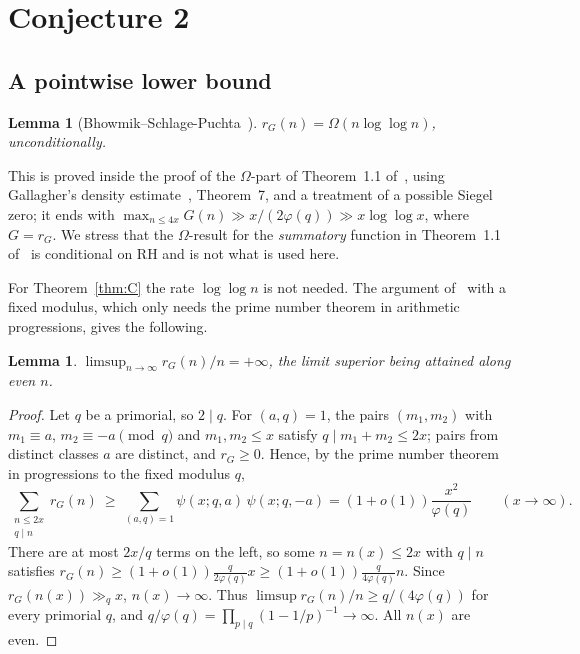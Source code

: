 \documentclass[11pt]{amsart}
\newtheorem{lemma}[theorem]{Lemma}
\theoremstyle{definition}
\theoremstyle{remark}
\numberwithin{equation}{section}
\newcommand{\rG}{r_G}
\begin{document}
\section{Conjecture 2}\label{sec:conj}

\subsection{A pointwise lower bound}
\begin{lemma}[Bhowmik--Schlage-Puchta~\cite{BSP}]\label{lem:BSP}
$\rG(n)=\Omega(n\log\log n)$, unconditionally.
\end{lemma}

This is proved inside the proof of the $\Omega$-part of Theorem~1.1 of~\cite{BSP}, using
Gallagher's density estimate~\cite{Ga}, Theorem~7, and a treatment of a possible Siegel
zero; it ends with $\max_{n\le4x}G(n)\gg x/(2\varphi(q))\gg x\log\log x$, where
$G=\rG$. We stress that the $\Omega$-result for the \emph{summatory} function in
Theorem~1.1 of~\cite{BSP} is conditional on RH and is not what is used here.

For Theorem~\ref{thm:C} the rate $\log\log n$ is not needed. The argument of~\cite{BSP}
with a fixed modulus, which only needs the prime number theorem in arithmetic
progressions, gives the following.

\begin{lemma}\label{lem:L}
$\limsup_{n\to\infty}\rG(n)/n=+\infty$, the limit superior being attained along even $n$.
\end{lemma}

\begin{proof}
Let $q$ be a primorial, so $2\mid q$. For $(a,q)=1$, the pairs $(m_1,m_2)$ with
$m_1\equiv a$, $m_2\equiv -a\pmod q$ and $m_1,m_2\le x$ satisfy $q\mid m_1+m_2\le 2x$;
pairs from distinct classes $a$ are distinct, and $\rG\ge0$. Hence, by the prime number
theorem in progressions to the fixed modulus $q$,
\[
  \sum_{\substack{n\le 2x\\ q\mid n}}\rG(n)\ \ge\ \sum_{(a,q)=1}\psi(x;q,a)\,\psi(x;q,-a)
  =(1+o(1))\frac{x^2}{\varphi(q)}\qquad(x\to\infty).
\]
There are at most $2x/q$ terms on the left, so some $n=n(x)\le 2x$ with $q\mid n$ satisfies
$\rG(n)\ge(1+o(1))\frac{q}{2\varphi(q)}x\ge(1+o(1))\frac{q}{4\varphi(q)}n$. Since
$\rG(n(x))\gg_q x$, $n(x)\to\infty$. Thus $\limsup\rG(n)/n\ge q/(4\varphi(q))$ for every
primorial $q$, and $q/\varphi(q)=\prod_{p\mid q}(1-1/p)^{-1}\to\infty$. All $n(x)$ are
even.
\end{proof}
\end{document}
